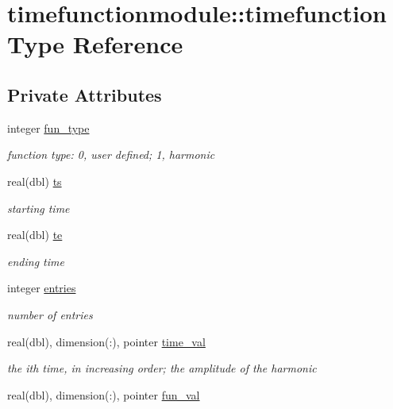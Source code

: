 \hypertarget{structtimefunctionmodule_1_1timefunction}{}\section{timefunctionmodule\+:\+:timefunction Type Reference}
\label{structtimefunctionmodule_1_1timefunction}
\subsection*{Private Attributes}
\begin{DoxyCompactItemize}
\item 
integer \hyperlink{structtimefunctionmodule_1_1timefunction_acd580915b25f29aa47c58467c394d2f4}{fun\+\_\+type}
\begin{DoxyCompactList}\small\item\em function type\+: 0, user defined; 1, harmonic \end{DoxyCompactList}\item 
real(dbl) \hyperlink{structtimefunctionmodule_1_1timefunction_a62e761e489833d17dcd1dbcac5c1dfd6}{ts}
\begin{DoxyCompactList}\small\item\em starting time \end{DoxyCompactList}\item 
real(dbl) \hyperlink{structtimefunctionmodule_1_1timefunction_a4378638965011462c9fd4a912f6dc8fd}{te}
\begin{DoxyCompactList}\small\item\em ending time \end{DoxyCompactList}\item 
integer \hyperlink{structtimefunctionmodule_1_1timefunction_a0f07f62ccbe6c9bcc7d9418b4157b234}{entries}
\begin{DoxyCompactList}\small\item\em number of entries \end{DoxyCompactList}\item 
real(dbl), dimension(\+:), pointer \hyperlink{structtimefunctionmodule_1_1timefunction_abad80cdb684de5f31a51015b9d88751f}{time\+\_\+val}
\begin{DoxyCompactList}\small\item\em the ith time, in increasing order; the amplitude of the harmonic \end{DoxyCompactList}\item 
real(dbl), dimension(\+:), pointer \hyperlink{structtimefunctionmodule_1_1timefunction_a7d1b3a0f76df56f38891ba45d161ca9d}{fun\+\_\+val}

\end{DoxyCompactItemize}
